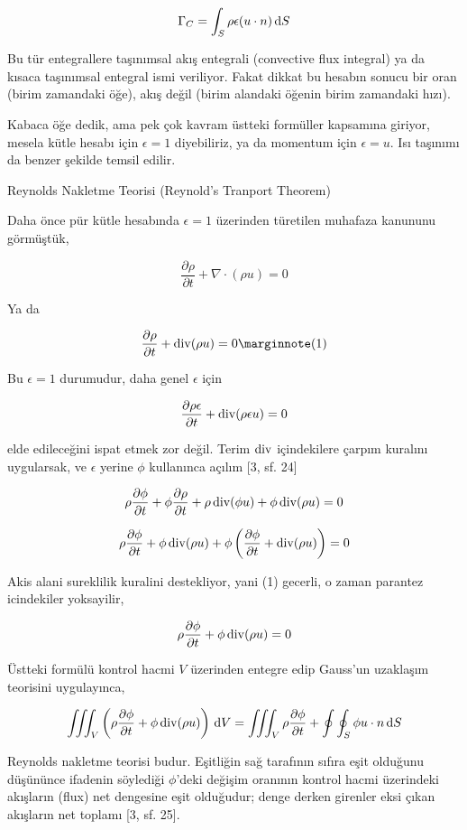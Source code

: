 \documentclass[12pt,fleqn]{article}\usepackage{../../common}
\begin{document}
$$
\Gamma_C = \int_S \rho \epsilon (u \cdot n) \,\mathrm{d} S
$$

Bu tür entegrallere taşınımsal akış entegrali (convective flux integral) ya da
kısaca taşınımsal entegral ismi veriliyor. Fakat dikkat bu hesabın sonucu bir
oran (birim zamandaki öğe), akış değil (birim alandaki öğenin birim zamandaki
hızı).

Kabaca öğe dedik, ama pek çok kavram üstteki formüller kapsamına giriyor, mesela
kütle hesabı için $\epsilon = 1$ diyebiliriz, ya da momentum için $\epsilon =
u$. Isı taşınımı da benzer şekilde temsil edilir.

Reynolds Nakletme Teorisi (Reynold's Tranport Theorem)

Daha önce pür kütle hesabında $\epsilon = 1$ üzerinden türetilen muhafaza
kanununu görmüştük,

$$
\frac{\partial \rho}{\partial t} + \nabla \cdot (\rho u ) = 0
$$

Ya da 

$$
\frac{\partial \rho}{\partial t} + \bdiv (\rho u ) = 0
\mlabel{1}
$$

Bu $\epsilon = 1$ durumudur, daha genel $\epsilon$ için

$$
\frac{\partial \rho \epsilon}{\partial t} + \operatorname{div} (\rho \epsilon u ) = 0
$$

elde edileceğini ispat etmek zor değil. Terim $\operatorname{div}$ içindekilere çarpım
kuralını uygularsak, ve $\epsilon$ yerine $\phi$ kullanınca açılım [3, sf. 24]

$$
\rho \frac{\partial \phi}{\partial t} +
\phi \frac{\partial \rho}{\partial t} + 
\rho \operatorname{div} (\phi u ) +
\phi \operatorname{div} (\rho u ) = 0
$$

$$
\rho \frac{\partial \phi}{\partial t} +
\phi \operatorname{div} (\rho u ) +
\phi \left(
  \frac{\partial \phi}{\partial t} + \operatorname{div} (\rho u ) 
\right) = 0
$$

Akis alani sureklilik kuralini destekliyor, yani (1) gecerli, o zaman
parantez icindekiler yoksayilir,

$$
\rho \frac{\partial \phi}{\partial t} + \phi \operatorname{div} (\rho u ) = 0
$$

Üstteki formülü kontrol hacmi $V$ üzerinden entegre edip Gauss'un uzaklaşım
teorisini uygulayınca,

$$
\iiint_V \left(
\rho \frac{\partial \phi}{\partial t} + \phi \operatorname{div} (\rho u )
\right) \,\mathrm{d} V =
\iiint_V \rho \frac{\partial \phi}{\partial t} +
\oint \oint_S \phi u \cdot n \,\mathrm{d} S 
$$

Reynolds nakletme teorisi budur. Eşitliğin sağ tarafının sıfıra eşit olduğunu
düşününce ifadenin söylediği $\phi$'deki değişim oranının kontrol hacmi
üzerindeki akışların (flux) net dengesine eşit olduğudur; denge derken girenler
eksi çıkan akışların net toplamı [3, sf. 25].
\end{document}

